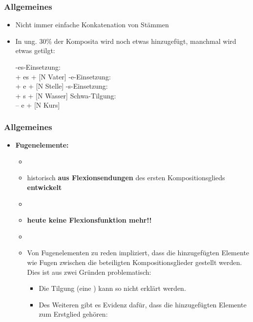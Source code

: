 \begin{frame}
\frametitle{Allgemeines}

\begin{itemize}
	\item Nicht immer einfache Konkatenation von Stämmen
	\item In ung. 30\% der Komposita wird noch etwas hinzugefügt, manchmal wird etwas getilgt:
	
	\eal 
		\ex -es-Einsetzung: \\
		 [N Landesvater] \ras [N Land] + es + [N Vater]
		\ex -e-Einsetzung: \\
		 [N Haltestelle] \ras [V halt] + e + [N Stelle]
		\ex -s-Einsetzung: \\
		 [N Leitungswasser] \ras [N Leitung] + s + [N Wasser]
		\ex Schwa-Tilgung: \\
		 [N Sprachkurs] \ras [N Sprache] – e + [N Kurs]
	\zl
		 
\end{itemize}


\end{frame}


\begin{frame}
\frametitle{Allgemeines}

\begin{itemize}
	\item \textbf{Fugenelemente:}
	
	\begin{itemize}
		\item[]
		\item historisch \textbf{aus Flexionsendungen} des ersten Kompositionsglieds \textbf{entwickelt}
		\item[]
		\item \textbf{heute keine Flexionsfunktion mehr!!}
		\item[]
		\item Von Fugenelementen zu reden impliziert, dass die hinzugefügten Elemente wie Fugen zwischen die beteiligten Kompositionsglieder gestellt werden. Dies ist aus zwei Gründen problematisch:
		
		\begin{itemize}
			\item Die Tilgung (eine ) kann so nicht erklärt werden.
			\item Des Weiteren gibt es Evidenz dafür, dass die hinzugefügten Elemente zum Erstglied gehören:
		\end{itemize}
	\end{itemize}
\end{itemize}


\end{frame}


